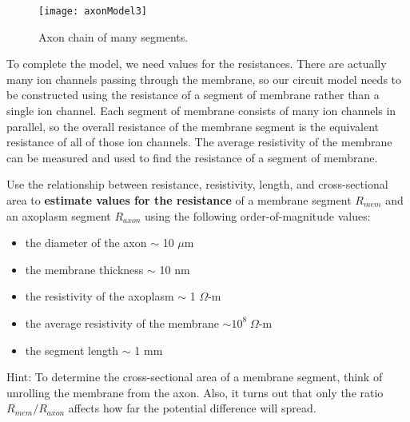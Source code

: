 \begin{wrapfigure}{R}{0.45\textwidth}
  \vspace{-15pt}  
  \begin{center}
    \texttt{[image: axonModel3]}
  \end{center}
  \caption{Axon chain of many segments.}
  \label{fig:axMod3}
  \vspace{-5pt}
\end{wrapfigure}

To complete the model, we need values for the resistances.
There are actually many ion channels passing through the membrane, so our circuit model needs to be constructed using the resistance of a segment of membrane rather  than a single ion channel.
Each segment of membrane consists of many ion channels in parallel, so the overall resistance of the membrane segment is the equivalent resistance of all of those ion channels. 
The average resistivity of the membrane can be measured and used to find the resistance of a segment of membrane.
\par 
Use the relationship between resistance, resistivity, length, and cross-sectional area to \textbf{estimate values for the resistance} of a membrane segment $R_{mem}$ and an axoplasm segment $R_{axon}$ using the following order-of-magnitude values:
\begin{itemize}
\itemsep-0.2em
\item the diameter of the axon $\sim$ 10 $\mu$m
\item the membrane thickness $\sim$ 10 nm
\item the resistivity of the axoplasm $\sim$ 1 $\Omega$-m
\item the average resistivity of the membrane $\sim  10^{8} \; \Omega$-m
\item the segment length $\sim$ 1 mm
\end{itemize}
Hint: To determine the cross-sectional area of a membrane segment, think of unrolling the membrane from the axon.
Also, it turns out that only the ratio $R_{mem}/R_{axon}$ affects how far the potential difference will spread.


